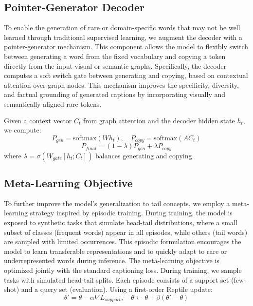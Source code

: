 \documentclass[journal]{IEEEtran}
\begin{document}
\subsection{Pointer-Generator Decoder}

To enable the generation of rare or domain-specific words that may not be well learned through traditional supervised learning, we augment the decoder with a pointer-generator mechanism. This component allows the model to flexibly switch between generating a word from the fixed vocabulary and copying a token directly from the input visual or semantic graphs. Specifically, the decoder computes a soft switch gate between generating and copying, based on contextual attention over graph nodes. This mechanism improves the specificity, diversity, and factual grounding of generated captions by incorporating visually and semantically aligned rare tokens.

Given a context vector $C_t$ from graph attention and the decoder hidden state $h_t$, we compute:
\begin{equation}
P_{gen} = \text{softmax}(W h_t), \quad P_{copy} = \text{softmax}(A C_t)
\end{equation}
\begin{equation}
P_{final} = (1 - \lambda) P_{gen} + \lambda P_{copy}
\end{equation}
where $\lambda = \sigma(W_{gate}[h_t; C_t])$ balances generating and copying.

\subsection{Meta-Learning Objective}

To further improve the model’s generalization to tail concepts, we employ a meta-learning strategy inspired by episodic training. During training, the model is exposed to synthetic tasks that simulate head-tail distributions, where a small subset of classes (frequent words) appear in all episodes, while others (tail words) are sampled with limited occurrences. This episodic formulation encourages the model to learn transferable representations and to quickly adapt to rare or underrepresented words during inference. The meta-learning objective is optimized jointly with the standard captioning loss.
During training, we sample tasks with simulated head-tail splits. Each episode consists of a support set (few-shot) and a query set (evaluation). Using a first-order Reptile update:
\begin{equation}
\theta' = \theta - \alpha \nabla L_{support}, \quad \theta \leftarrow \theta + \beta (\theta' - \theta)
\end{equation}
\end{document}
